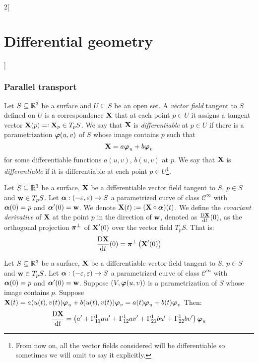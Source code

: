 \documentclass[../../../main_math.tex]{subfiles}
\begin{document}
\begin{multicols}{2}[\section{Differential geometry}]
  \subsubsection{Parallel transport}
  \begin{definition}
    Let $S\subseteq\mathbb{R}^3$ be a surface and $U\subseteq S$ be an open set. A \emph{vector field} tangent to $S$ defined on $U$ is a correspondence $\boldsymbol{\mathrm{X}}$ that at each point $p\in U$ it assigns a tangent vector $\boldsymbol{\mathrm{X}}(p)=:\boldsymbol{\mathrm{X}}_p\in T_pS$. We say that $\boldsymbol{\mathrm{X}}$ is \emph{differentiable} at $p\in U$ if there is a parametrization $\boldsymbol{\mathrm{\varphi}}(u,v)$ of $S$ whose image contains $p$ such that $$\boldsymbol{\mathrm{X}}=a\boldsymbol{\mathrm{\varphi}}_u+b\boldsymbol{\mathrm{\varphi}}_v$$ for some differentiable functions $a(u,v)$, $b(u,v)$ at $p$. We say that $\boldsymbol{\mathrm{X}}$ is \emph{differentiable} if it is differentiable at each point $p\in U$\footnote{From now on, all the vector fields considered will be differentiable so sometimes we will omit to say it explicitly.}.
  \end{definition}
  \begin{definition}
    Let $S\subseteq\mathbb{R}^3$ be a surface, $\boldsymbol{\mathrm{X}}$ be a differentiable vector field tangent to $S$, $p\in S$ and $\boldsymbol{\mathrm{w}}\in T_pS$. Let $\boldsymbol{\mathrm{\alpha}}:(-\varepsilon,\varepsilon)\rightarrow S$ a parametrized curve of class $\mathcal{C}^\infty$ with $\boldsymbol{\mathrm{\alpha}}(0)=p$ and $\boldsymbol{\mathrm{\alpha}}'(0)=\boldsymbol{\mathrm{w}}$. We denote $\boldsymbol{\mathrm{X}}(t):=(\boldsymbol{\mathrm{X}}\circ\boldsymbol{\mathrm{\alpha}})(t)$. We define the \emph{covariant derivative} of $\boldsymbol{\mathrm{X}}$ at the point $p$ in the direction of $\boldsymbol{\mathrm{w}}$, denoted as $\frac{\text{D}\boldsymbol{\mathrm{X}}}{\dd{t}}(0)$, as the orthogonal projection $\boldsymbol{\mathrm{\pi}}^\perp$ of $\boldsymbol{\mathrm{X}}'(0)$ over the vector field $T_pS$. That is: $$\frac{\text{D}\boldsymbol{\mathrm{X}}}{\dd{t}}(0)=\boldsymbol{\mathrm{\pi}}^\perp\left(\boldsymbol{\mathrm{X}}'(0)\right)$$
  \end{definition}
  \begin{proposition}
    Let $S\subseteq\mathbb{R}^3$ be a surface, $\boldsymbol{\mathrm{X}}$ be a differentiable vector field tangent to $S$, $p\in S$ and $\boldsymbol{\mathrm{w}}\in T_pS$. Let $\boldsymbol{\mathrm{\alpha}}:(-\varepsilon,\varepsilon)\rightarrow S$ a parametrized curve of class $\mathcal{C}^\infty$ with $\boldsymbol{\mathrm{\alpha}}(0)=p$ and $\boldsymbol{\mathrm{\alpha}}'(0)=\boldsymbol{\mathrm{w}}$. Suppose $(V,\boldsymbol{\mathrm{\varphi}}(u,v))$ is a parametrization of $S$ whose image contains $p$. Suppose $\boldsymbol{\mathrm{X}}(t)=a(u(t),v(t))\boldsymbol{\mathrm{\varphi}}_u+b(u(t),v(t))\boldsymbol{\mathrm{\varphi}}_v=a(t)\boldsymbol{\mathrm{\varphi}}_u+b(t)\boldsymbol{\mathrm{\varphi}}_v$ Then:
    \begin{multline}\label{DG_covderivative}
      \frac{\text{D}\vf{X}}{\dd{t}}=\left(a'+\Gamma_{11}^1au'+\Gamma_{12}^1av'+\Gamma_{21}^1bu'+\Gamma_{22}^1bv'\right)\vf\varphi_u\\

\end{multline}
\end{proposition}
\end{multicols}
\end{document}
